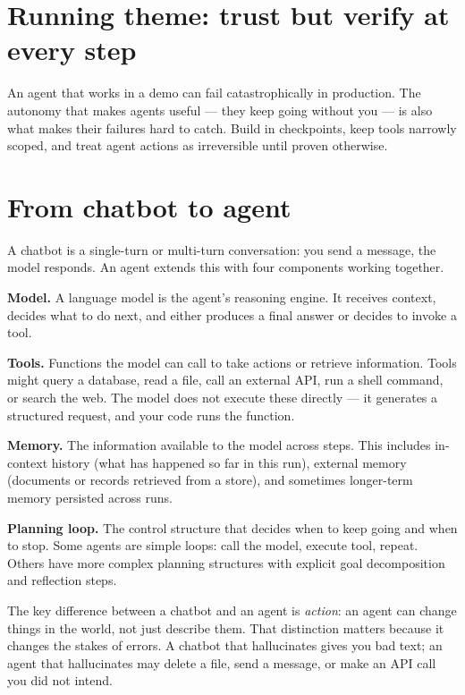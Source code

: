 \section*{Running theme: trust but verify at every step}

An agent that works in a demo can fail catastrophically in production. The autonomy that makes agents useful --- they keep going without you --- is also what makes their failures hard to catch. Build in checkpoints, keep tools narrowly scoped, and treat agent actions as irreversible until proven otherwise.

\section{From chatbot to agent}

A chatbot is a single-turn or multi-turn conversation: you send a message, the model responds. An agent extends this with four components working together.

\textbf{Model.} A language model is the agent's reasoning engine. It receives context, decides what to do next, and either produces a final answer or decides to invoke a tool.

\textbf{Tools.} Functions the model can call to take actions or retrieve information. Tools might query a database, read a file, call an external API, run a shell command, or search the web. The model does not execute these directly --- it generates a structured request, and your code runs the function.

\textbf{Memory.} The information available to the model across steps. This includes in-context history (what has happened so far in this run), external memory (documents or records retrieved from a store), and sometimes longer-term memory persisted across runs.

\textbf{Planning loop.} The control structure that decides when to keep going and when to stop. Some agents are simple loops: call the model, execute tool, repeat. Others have more complex planning structures with explicit goal decomposition and reflection steps.


The key difference between a chatbot and an agent is \emph{action}: an agent can change things in the world, not just describe them. That distinction matters because it changes the stakes of errors. A chatbot that hallucinates gives you bad text; an agent that hallucinates may delete a file, send a message, or make an API call you did not intend.

